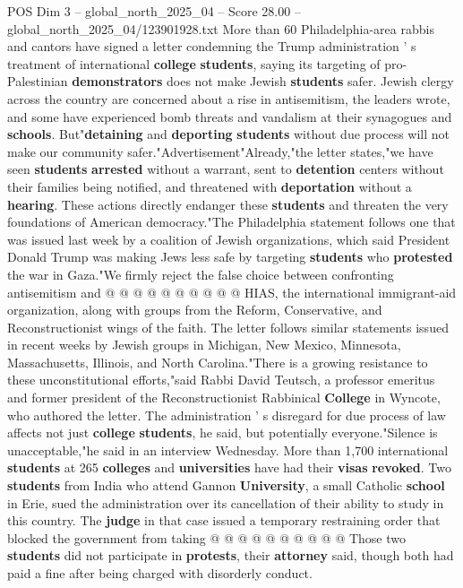 \begin{textsample}{POS Dim 3 – global\_north\_2025\_04 – Score 28.00 – global\_north\_2025\_04/123901928.txt}  \label{ex:f3_pos_049}
More than 60 Philadelphia-area rabbis and cantors have signed a letter condemning the Trump administration ' s treatment of international \textbf{college} \textbf{students}, saying its targeting of pro-Palestinian \textbf{demonstrators} does not make Jewish \textbf{students} safer.
Jewish clergy across the country are concerned about a rise in antisemitism, the leaders wrote, and some have experienced bomb threats and vandalism at their synagogues and \textbf{schools}.
But"\textbf{detaining} and \textbf{deporting} \textbf{students} without due process will not make our community safer."Advertisement"Already,"the letter states,"we have seen \textbf{students} \textbf{arrested} without a warrant, sent to \textbf{detention} centers without their families being notified, and threatened with \textbf{deportation} without a \textbf{hearing}.
These actions directly endanger these \textbf{students} and threaten the very foundations of American democracy."The Philadelphia statement follows one that was issued last week by a coalition of Jewish organizations, which said President Donald Trump was making Jews less safe by targeting \textbf{students} who \textbf{protested} the war in Gaza."We firmly reject the false choice between confronting antisemitism and @ @ @ @ @ @ @ @ @ @ HIAS, the international immigrant-aid organization, along with groups from the Reform, Conservative, and Reconstructionist wings of the faith.
The letter follows similar statements issued in recent weeks by Jewish groups in Michigan, New Mexico, Minnesota, Massachusetts, Illinois, and North Carolina."There is a growing resistance to these unconstitutional efforts,"said Rabbi David Teutsch, a professor emeritus and former president of the Reconstructionist Rabbinical \textbf{College} in Wyncote, who authored the letter.
The administration ' s disregard for due process of law affects not just \textbf{college} \textbf{students}, he said, but potentially everyone."Silence is unacceptable,"he said in an interview Wednesday.
More than 1,700 international \textbf{students} at 265 \textbf{colleges} and \textbf{universities} have had their \textbf{visas} \textbf{revoked}.
Two \textbf{students} from India who attend Gannon \textbf{University}, a small Catholic \textbf{school} in Erie, sued the administration over its cancellation of their ability to study in this country.
The \textbf{judge} in that case issued a temporary restraining order that blocked the government from taking @ @ @ @ @ @ @ @ @ @ Those two \textbf{students} did not participate in \textbf{protests}, their \textbf{attorney} said, though both had paid a fine after being charged with disorderly conduct.

\end{textsample}
